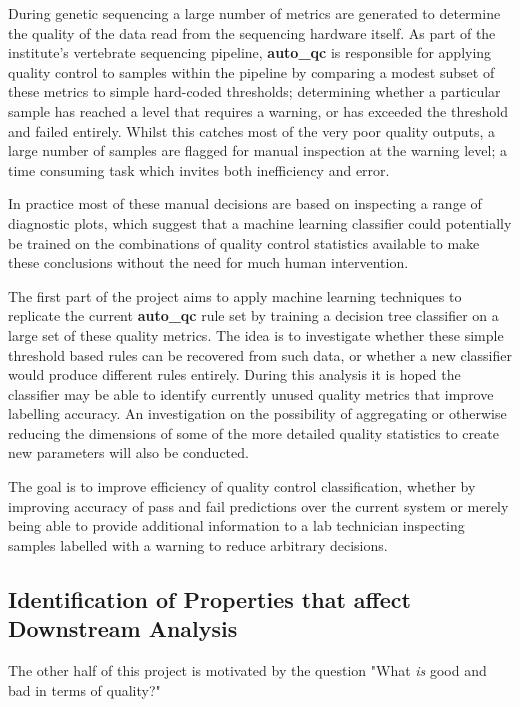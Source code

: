 During genetic sequencing a large number of metrics are generated to determine
the quality of the data read from the sequencing hardware itself. As part of the
institute's vertebrate sequencing pipeline\citep{github:vr-pipe},
\textbf{auto\_qc} is responsible for applying quality control to samples within
the pipeline by comparing a modest subset of these metrics to simple hard-coded
thresholds; determining whether a particular sample has reached a level that
requires a warning, or has exceeded the threshold and failed entirely. Whilst
this catches most of the very poor quality outputs, a large number of samples
are flagged for manual inspection at the warning level; a time consuming task
which invites both inefficiency and error.

In practice most of these manual decisions are based on inspecting a range of
diagnostic plots, which suggest that a machine learning classifier could
potentially be trained on the combinations of quality control statistics
available to make these conclusions without the need for much human
intervention\citep{marireport}.

The first part of the project aims to apply machine learning techniques to
replicate the current \textbf{auto\_qc} rule set by training a decision tree
classifier on a large set of these quality metrics. The idea is to investigate
whether these simple threshold based rules can be recovered from such data, or
whether a new classifier would produce different rules entirely. During this
analysis it is hoped the classifier may be able to identify currently unused
quality metrics that improve labelling accuracy. An investigation on the
possibility of aggregating or otherwise reducing the dimensions of some of the
more detailed quality statistics to create new parameters will also be
conducted.

The goal is to improve efficiency of quality control classification, whether by
improving accuracy of pass and fail predictions over the current system or
merely being able to provide additional information to a lab technician
inspecting samples labelled with a warning to reduce arbitrary decisions.

\subsection{Identification of Properties that affect Downstream Analysis}

The other half of this project is motivated by the question "What \textit{is}
good and bad in terms of quality?"

